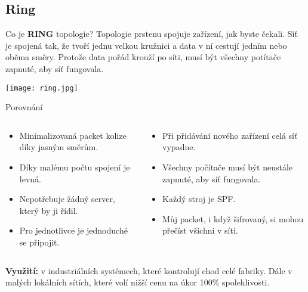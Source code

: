 \documentclass{beamer}
\begin{document}
\subsection{Ring}
\label{sec:ring}

\begin{frame}{Co je \textbf{RING} topologie?}
 Topologie prstenu spojuje zařízení, jak byste čekali. Síť je spojená tak, že
 tvoří jednu velkou kružnici a data v ní cestují jedním nebo oběma směry.
 Protože data pořád krouží po síti, musí být všechny potítače zapnuté, aby síť
 fungovala.

 \texttt{[image: ring.jpg]}
 
\end{frame}

\begin{frame}{Porovnání}

\begin{columns}
    \begin{column}{0.45\textwidth}
        \begin{itemize}
            \item Minimalizovaná packet kolize díky jasným směrům.
            \item Díky malému počtu spojení je levná.
            \item Nepotřebuje žádný server, který by ji řídil.
            \item Pro jednotlivce je jednoduché se připojit.
        \end{itemize}
    \end{column}
    \begin{column}{0.45\textwidth}  %
        \begin{itemize}
            \item Při přidávání nového zařízení celá síť vypadne.
            \item Všechny počítače musí být neustále zapnuté, aby síť fungovala.
            \item Každý stroj je SPF.
            \item Můj packet, i když šifrovaný, si mohou přečíst všichni v síti.
        \end{itemize}
    \end{column}
    \end{columns}
    \vspace{10pt}

\textbf{Využití:} v industriálních systémech, které kontrolují chod celé
fabriky. Dále v malých lokálních sítích, které volí nižší cenu na úkor 100\%
spolehlivosti.

\end{frame}
\end{document}
